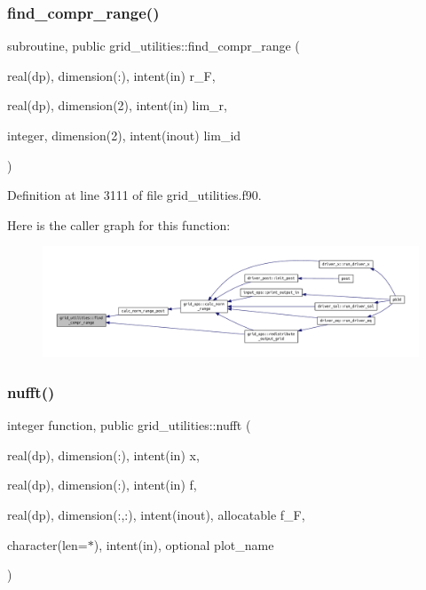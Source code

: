 \subsubsection{\texorpdfstring{find\+\_\+compr\+\_\+range()}{find\_compr\_range()}}
{\footnotesize\ttfamily subroutine, public grid\+\_\+utilities\+::find\+\_\+compr\+\_\+range (\begin{DoxyParamCaption}\item[{real(dp), dimension(\+:), intent(in)}]{r\+\_\+F,  }\item[{real(dp), dimension(2), intent(in)}]{lim\+\_\+r,  }\item[{integer, dimension(2), intent(inout)}]{lim\+\_\+id }\end{DoxyParamCaption})}



Definition at line 3111 of file grid\+\_\+utilities.\+f90.

Here is the caller graph for this function\+:
\nopagebreak
\begin{figure}[H]
\begin{center}
\leavevmode
\includegraphics[width=350pt]{namespacegrid__utilities_ae08e1ff213071c9d411a9b9c76035e1e_icgraph}
\end{center}
\end{figure}
\mbox{\label{namespacegrid__utilities_a0854b2d6cc61a31f68b4afe7304077a9}} 
\subsubsection{\texorpdfstring{nufft()}{nufft()}}
{\footnotesize\ttfamily integer function, public grid\+\_\+utilities\+::nufft (\begin{DoxyParamCaption}\item[{real(dp), dimension(\+:), intent(in)}]{x,  }\item[{real(dp), dimension(\+:), intent(in)}]{f,  }\item[{real(dp), dimension(\+:,\+:), intent(inout), allocatable}]{f\+\_\+F,  }\item[{character(len=$\ast$), intent(in), optional}]{plot\+\_\+name }\end{DoxyParamCaption})}



